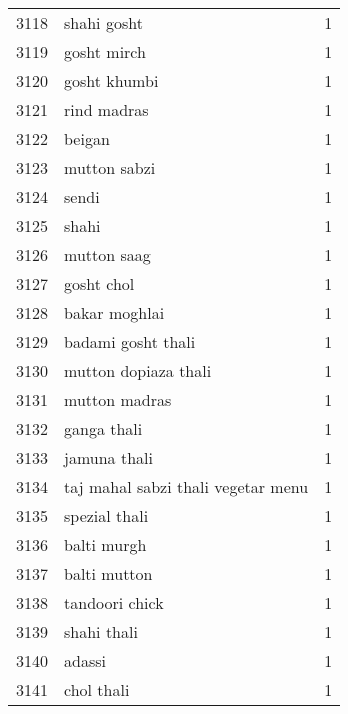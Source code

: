 \begin{tabular}{llr}
3118 &                                        shahi gosht &      1 \\
3119 &                                        gosht mirch &      1 \\
3120 &                                       gosht khumbi &      1 \\
3121 &                                        rind madras &      1 \\
3122 &                                             beigan &      1 \\
3123 &                                       mutton sabzi &      1 \\
3124 &                                              sendi &      1 \\
3125 &                                              shahi &      1 \\
3126 &                                        mutton saag &      1 \\
3127 &                                         gosht chol &      1 \\
3128 &                                      bakar moghlai &      1 \\
3129 &                                 badami gosht thali &      1 \\
3130 &                               mutton dopiaza thali &      1 \\
3131 &                                      mutton madras &      1 \\
3132 &                                        ganga thali &      1 \\
3133 &                                       jamuna thali &      1 \\
3134 &                 taj mahal sabzi thali vegetar menu &      1 \\
3135 &                                      spezial thali &      1 \\
3136 &                                        balti murgh &      1 \\
3137 &                                       balti mutton &      1 \\
3138 &                                     tandoori chick &      1 \\
3139 &                                        shahi thali &      1 \\
3140 &                                             adassi &      1 \\
3141 &                                         chol thali &      1 \\

\end{tabular}
